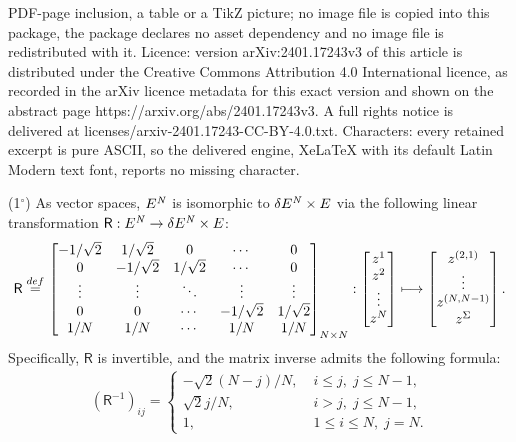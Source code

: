 \documentclass[10pt,a4paper]{amsart}
\newcommand{\CN}{E^{\it N}}
\newcommand{\cc}{{^\circ}}
\newcommand{\defeq}{{\stackrel{\rm def}{=}}}
\newcommand{\lmt}{\longmapsto}
\newcommand{\two}{{\sqrt{2}}}
\begin{document}
PDF-page inclusion, a table or a TikZ picture; no image file is copied into this package, the package declares no asset dependency and no image file is redistributed with it. Licence: version arXiv:2401.17243v3 of this article is distributed under the Creative Commons Attribution 4.0 International licence, as recorded in the arXiv licence metadata for this exact version and shown on the abstract page https://arxiv.org/abs/2401.17243v3. A full rights notice is delivered at licenses/arxiv-2401.17243-CC-BY-4.0.txt. Characters: every retained excerpt is pure ASCII, so the delivered engine, XeLaTeX with its default Latin Modern text font, reports no missing character.
\begin{prop}\label{prop:RM}
{\rm (1$\cc$)} As vector spaces,
$\CN$ is isomorphic to  $\delta \CN\times E$ via the following
linear transformation $\mathsf R:\CN\to \delta \CN\times E$:
\begin{align}
\mathsf R\;\defeq\, \begin{bmatrix}
-1/\two & 1/\two & 0&\cdots &0\\
0 &-1/\two&1/\two& \cdots &0\\
\vdots &\vdots &\ddots &\vdots&\vdots\\
0 &0 &\cdots &-1/\two &1/\two\\
1/N&1/N &\cdots &1/N &1/N
\end{bmatrix}_{N\times N}:
\begin{bmatrix}
z^1\\
z^2\\
\vdots\\
z^N
\end{bmatrix}
\lmt \begin{bmatrix}
z^{(2,1)}\\
\vdots\\
z^{(N,N-1)}\\
z^\Sigma
\end{bmatrix}.\label{def:R}
\end{align}
Specifically, $\mathsf R$ is invertible, and the matrix inverse admits the following formula:
\begin{align}\label{def:Rinv}
(\mathsf R^{-1})_{ij}=
\begin{cases}
\displaystyle -\two (N-j)/N,&\; i\leq j,\; j\leq N-1,\\
\displaystyle \two j/N,&\;i>j,\;j\leq N-1,\\
\displaystyle 1, &\;1\leq i\leq N,\;j=N.
\end{cases}
\end{align} 


\end{prop}
\end{document}
